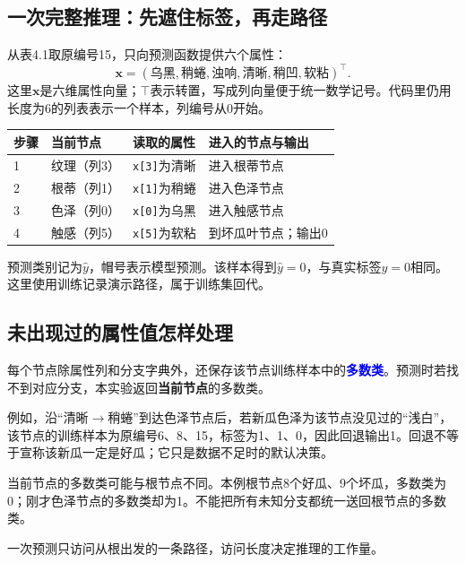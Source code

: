 \documentclass[UTF8,a4paper,11pt,fontset=fandol]{ctexart}
\numberwithin{equation}{subsection}
\newcommand{\term}[1]{\textcolor{Blue}{\textbf{#1}}}
\begin{document}
\clearpage
\subsection{一次完整推理：先遮住标签，再走路径}
从表4.1取原编号15，只向预测函数提供六个属性：
\begin{equation}
\mathbf x=(\text{乌黑},\text{稍蜷},\text{浊响},\text{清晰},\text{稍凹},\text{软粘})^\top.
\end{equation}
这里$\mathbf x$是六维属性向量；$\top$表示转置，写成列向量便于统一数学记号。代码里仍用长度为6的列表表示一个样本，列编号从0开始。

\par\noindent\begin{tabularx}{\textwidth}{C{.9cm}L{2cm}L{2.8cm}Y}
\toprule
步骤 & 当前节点 & 读取的属性 & 进入的节点与输出\\
 & 纹理（列3） & \texttt{x[3]}为清晰 & 进入根蒂节点\\
2 & 根蒂（列1） & \texttt{x[1]}为稍蜷 & 进入色泽节点\\
3 & 色泽（列0） & \texttt{x[0]}为乌黑 & 进入触感节点\\
4 & 触感（列5） & \texttt{x[5]}为软粘 & 到坏瓜叶节点；输出0\\
\bottomrule
\end{tabularx}\par
\begin{keybox}
预测类别记为$\hat y$，帽号表示模型预测。该样本得到$\hat y=0$，与真实标签$y=0$相同。这里使用训练记录演示路径，属于训练集回代。
\end{keybox}

\subsection{未出现过的属性值怎样处理}
每个节点除属性列和分支字典外，还保存该节点训练样本中的\term{多数类}。预测时若找不到对应分支，本实验返回\textbf{当前节点}的多数类。

例如，沿“清晰$\to$稍蜷”到达色泽节点后，若新瓜色泽为该节点没见过的“浅白”，该节点的训练样本为原编号6、8、15，标签为1、1、0，因此回退输出1。回退不等于宣称该新瓜一定是好瓜；它只是数据不足时的默认决策。

\begin{pitfallbox}
当前节点的多数类可能与根节点不同。本例根节点8个好瓜、9个坏瓜，多数类为0；刚才色泽节点的多数类却为1。不能把所有未知分支都统一送回根节点的多数类。
\end{pitfallbox}
一次预测只访问从根出发的一条路径，访问长度决定推理的工作量。
\end{document}
